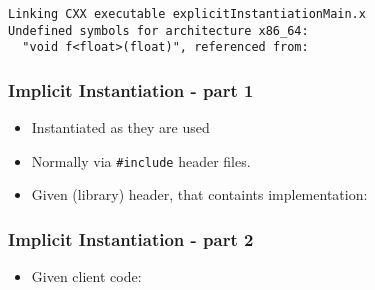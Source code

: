 \begin{verbatim}
Linking CXX executable explicitInstantiationMain.x
Undefined symbols for architecture x86_64:
  "void f<float>(float)", referenced from:
\end{verbatim}

\hypertarget{implicit-instantiation---part-1}{%
\subsubsection{Implicit Instantiation - part
1}\label{implicit-instantiation---part-1}}

\begin{itemize}
\item
  Instantiated as they are used
\item
  Normally via \texttt{\#include} header files.
\item
  Given (library) header, that containts implementation:
\end{itemize}

\begin{Shaded}
\begin{Highlighting}[]
\NormalTok{ <}\NormalTok{; \}}
\end{Highlighting}
\end{Shaded}

\hypertarget{implicit-instantiation---part-2}{%
\subsubsection{Implicit Instantiation - part
2}\label{implicit-instantiation---part-2}}

\begin{itemize}
\tightlist
\item
  Given client code:
\end{itemize}

